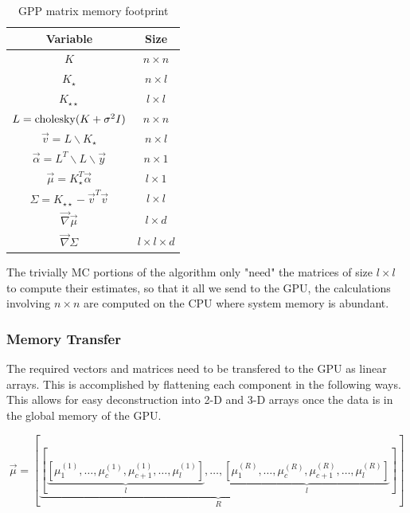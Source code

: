 \documentclass[phd,tocprelim]{cornell}
\begin{document}
\begin{table}
    \caption{GPP matrix memory footprint}
    \label{EPImemory}
\begin{center}
    \begin{tabular}{c|c}
    Variable & Size \\
    \hline
    $K$ & $n \times n$ \\
    $K_{\star }$ & $n \times l$ \\
    $K_{\star \star }$ & $l \times l$ \\ 
    $L = {\rm cholesky}(K + \sigma^{2}I) $ & $n \times n$ \\
    $\vec{v} = L \backslash K_{\star }$ & $n \times l$ \\
    $\vec{\alpha} = L^{T} \backslash L \backslash \vec{y}$ & $n \times 1$ \\
    $\vec{\mu} = K_{\star }^{T}\vec{\alpha}$ & $l \times 1$  \\
    $\Sigma = K_{\star \star} - \vec{v}^{T}\vec{v}$ & $l \times l$ \\
    $\vec{\nabla} \vec{\mu}$ & $l \times d$ \\
    $\vec{\nabla} \Sigma$ & $l \times l \times d$
    \end{tabular}
\end{center}
\end{table}

The trivially MC portions of the algorithm only "need" the matrices of size $l \times l$ to compute their estimates, so that it all we send to the GPU, the calculations involving $n \times n$ are computed on the CPU where system memory is abundant.

\subsubsection{Memory Transfer} %
\label{ssub:Memory Transfer}

The required vectors and matrices need to be transfered to the GPU as linear arrays. This is accomplished by flattening each component in the following ways. This allows for easy deconstruction into 2-D and 3-D arrays once the data is in the global memory of the GPU.

\begin{equation}
    \vec{\mu} = \left[ \underbrace{\left[ \underbrace{\left[\mu_{1}^{(1)}, \ldots, \mu_{c}^{(1)}, \mu_{c+1}^{(1)}, \ldots, \mu_{l}^{(1)} \right]}_{l}, \ldots, \underbrace{\left[\mu_{1}^{(R)}, \ldots, \mu_{c}^{(R)}, \mu_{c+1}^{(R)}, \ldots, \mu_{l}^{(R)} \right]}_{l} \right]}_{R} \right]
\end{equation}
\end{document}
